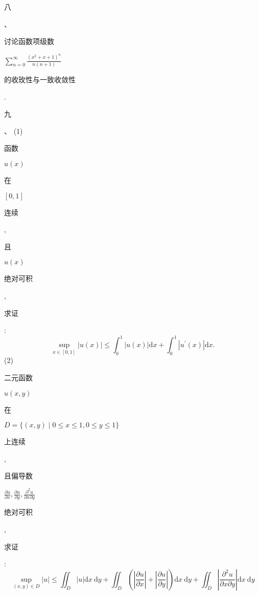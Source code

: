\documentclass[10pt]{article}
\begin{document}
\begin{CJK}{UTF8}{mj}八\end{CJK}、\begin{CJK}{UTF8}{mj}讨论函数项级数\end{CJK} $\sum_{n=0}^{\infty} \frac{\left(x^{2}+x+1\right)^{n}}{n(n+1)}$ \begin{CJK}{UTF8}{mj}的收玫性与一致收敛性\end{CJK}.

\begin{CJK}{UTF8}{mj}九\end{CJK}、 (1) \begin{CJK}{UTF8}{mj}函数\end{CJK} $u(x)$ \begin{CJK}{UTF8}{mj}在\end{CJK} $[0,1]$ \begin{CJK}{UTF8}{mj}连续\end{CJK}, \begin{CJK}{UTF8}{mj}且\end{CJK} $u(x)$ \begin{CJK}{UTF8}{mj}绝对可积\end{CJK}, \begin{CJK}{UTF8}{mj}求证\end{CJK}:
$$
\sup _{x \in[0,1]}|u(x)| \leq \int_{0}^{1}|u(x)| \mathrm{d} x+\int_{0}^{1}\left|u^{\prime}(x)\right| \mathrm{d} x .
$$
(2) \begin{CJK}{UTF8}{mj}二元函数\end{CJK} $u(x, y)$ \begin{CJK}{UTF8}{mj}在\end{CJK} $D=\{(x, y) \mid 0 \leq x \leq 1,0 \leq y \leq 1\}$ \begin{CJK}{UTF8}{mj}上连续\end{CJK}, \begin{CJK}{UTF8}{mj}且偏导数\end{CJK} $\frac{\partial u}{\partial x}, \frac{\partial u}{\partial y}, \frac{\partial^{2} u}{\partial x \partial y}$ \begin{CJK}{UTF8}{mj}绝对可积\end{CJK}, \begin{CJK}{UTF8}{mj}求证\end{CJK}:
$$
\sup _{(x, y) \in D}|u| \leq \iint_{D}|u| \mathrm{d} x \mathrm{~d} y+\iint_{D}\left(\left|\frac{\partial u}{\partial x}\right|+\left|\frac{\partial u}{\partial y}\right|\right) \mathrm{d} x \mathrm{~d} y+\iint_{D}\left|\frac{\partial^{2} u}{\partial x \partial y}\right| \mathrm{d} x \mathrm{~d} y
$$
\end{document}
